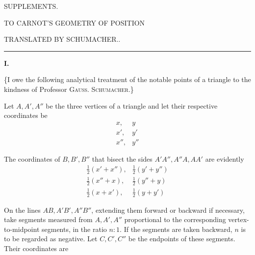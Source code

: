 \clearpage
{}
\begin{center}
{\Large SUPPLEMENTS.}\par\bigskip
TO CARNOT'S GEOMETRY OF POSITION\par\bigskip
TRANSLATED BY SCHUMACHER..\par\bigskip
\rule{.1\textwidth}{.3pt}
\end{center}
\par\medskip{}
\centerline{\textbf{I.}}\nobreak\smallskip
\{I owe the following analytical treatment of the notable points of a triangle to the kindness of Professor \textsc{Gauss}. \textsc{Schumacher}.\}

Let \(A,A',A''\) be the three vertices of a triangle and let their respective coordinates be
\[
\begin{array}{ll}
x,&y\\x',&y'\\x'',&y''
\end{array}
\]
\par
The coordinates of \(B,B',B''\) that bisect the sides \(A'A'',A''A,AA'\) are evidently
\[
\begin{array}{ll}
\tfrac12(x'+x''),&\tfrac12(y'+y'')\\
\tfrac12(x''+x),&\tfrac12(y''+y)\\
\tfrac12(x+x'),&\tfrac12(y+y')
\end{array}
\]
\par
On the lines \(AB,A'B',A''B''\), extending them forward or backward if necessary, take segments measured from \(A,A',A''\) proportional to the corresponding vertex-to-midpoint segments, in the ratio \(n:1\). If the segments are taken backward, \(n\) is to be regarded as negative. Let \(C,C',C''\) be the endpoints of these segments. Their coordinates are
